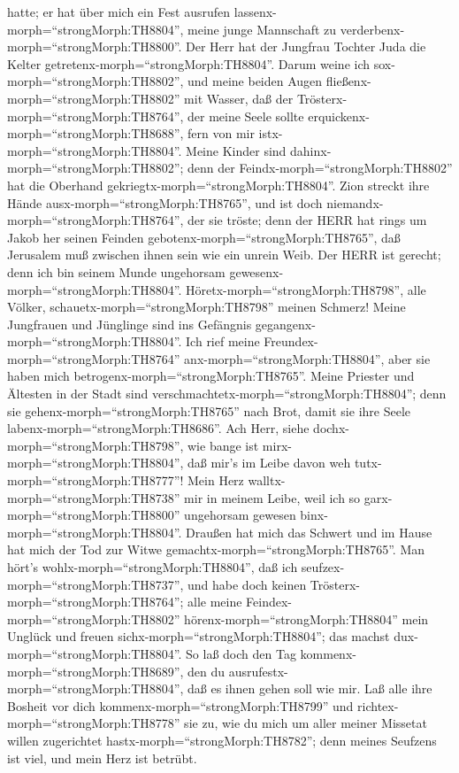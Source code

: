 hatte; er hat über mich ein Fest ausrufen
lassenx-morph=``strongMorph:TH8804'', meine junge Mannschaft zu
verderbenx-morph=``strongMorph:TH8800''. Der Herr hat der Jungfrau
Tochter Juda die Kelter getretenx-morph=``strongMorph:TH8804''.
 Darum weine ich sox-morph=``strongMorph:TH8802'', und
meine beiden Augen fließenx-morph=``strongMorph:TH8802'' mit Wasser, daß
der Trösterx-morph=``strongMorph:TH8764'', der meine Seele sollte
erquickenx-morph=``strongMorph:TH8688'', fern von mir
istx-morph=``strongMorph:TH8804''. Meine Kinder sind
dahinx-morph=``strongMorph:TH8802''; denn der
Feindx-morph=``strongMorph:TH8802'' hat die Oberhand
gekriegtx-morph=``strongMorph:TH8804''.  Zion streckt ihre
Hände ausx-morph=``strongMorph:TH8765'', und ist doch
niemandx-morph=``strongMorph:TH8764'', der sie tröste; denn der HERR hat
rings um Jakob her seinen Feinden gebotenx-morph=``strongMorph:TH8765'',
daß Jerusalem muß zwischen ihnen sein wie ein unrein Weib. 
Der HERR ist gerecht; denn ich bin seinem Munde ungehorsam
gewesenx-morph=``strongMorph:TH8804''.
Höretx-morph=``strongMorph:TH8798'', alle Völker,
schauetx-morph=``strongMorph:TH8798'' meinen Schmerz! Meine Jungfrauen
und Jünglinge sind ins Gefängnis gegangenx-morph=``strongMorph:TH8804''.
 Ich rief meine Freundex-morph=``strongMorph:TH8764''
anx-morph=``strongMorph:TH8804'', aber sie haben mich
betrogenx-morph=``strongMorph:TH8765''. Meine Priester und Ältesten in
der Stadt sind verschmachtetx-morph=``strongMorph:TH8804''; denn sie
gehenx-morph=``strongMorph:TH8765'' nach Brot, damit sie ihre Seele
labenx-morph=``strongMorph:TH8686''.  Ach Herr, siehe
dochx-morph=``strongMorph:TH8798'', wie bange ist
mirx-morph=``strongMorph:TH8804'', daß mir's im Leibe davon weh
tutx-morph=``strongMorph:TH8777''! Mein Herz
walltx-morph=``strongMorph:TH8738'' mir in meinem Leibe, weil ich so
garx-morph=``strongMorph:TH8800'' ungehorsam gewesen
binx-morph=``strongMorph:TH8804''. Draußen hat mich das Schwert und im
Hause hat mich der Tod zur Witwe gemachtx-morph=``strongMorph:TH8765''.
 Man hört's wohlx-morph=``strongMorph:TH8804'', daß ich
seufzex-morph=``strongMorph:TH8737'', und habe doch keinen
Trösterx-morph=``strongMorph:TH8764''; alle meine
Feindex-morph=``strongMorph:TH8802'' hörenx-morph=``strongMorph:TH8804''
mein Unglück und freuen sichx-morph=``strongMorph:TH8804''; das machst
dux-morph=``strongMorph:TH8804''. So laß doch den Tag
kommenx-morph=``strongMorph:TH8689'', den du
ausrufestx-morph=``strongMorph:TH8804'', daß es ihnen gehen soll wie
mir.  Laß alle ihre Bosheit vor dich
kommenx-morph=``strongMorph:TH8799'' und
richtex-morph=``strongMorph:TH8778'' sie zu, wie du mich um aller meiner
Missetat willen zugerichtet hastx-morph=``strongMorph:TH8782''; denn
meines Seufzens ist viel, und mein Herz ist betrübt.

